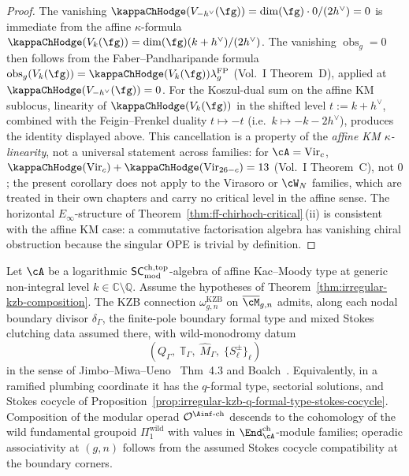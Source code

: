 \begin{proof}
The vanishing $\kappaChHodge(V_{-h^\vee}(\fg)) = \dim(\fg)\cdot 0/(2h^\vee)
= 0$ is immediate from the affine $\kappa$-formula
$\kappaChHodge(V_k(\fg)) = \dim(\fg)(k+h^\vee)/(2h^\vee)$. The vanishing
$\operatorname{obs}_g = 0$ then follows from the
Faber--Pandharipande formula
$\operatorname{obs}_g(V_k(\fg))
=\kappaChHodge(V_k(\fg))\lambda_g^{\mathrm{FP}}$
(Vol.~I Theorem~D), applied at
\(\kappaChHodge(V_{-h^\vee}(\fg))=0\). For the Koszul-dual
sum on the affine KM sublocus, linearity of
$\kappaChHodge(V_k(\fg))$ in the shifted level $t := k+h^\vee$, combined
with the Feigin--Frenkel duality $t \mapsto -t$
(i.e.\ $k \mapsto -k-2h^\vee$), produces the identity displayed
above. This cancellation is a property of the
\emph{affine KM $\kappa$-linearity}, not a universal statement
across families: for $\cA = \mathrm{Vir}_c$, $\kappaChHodge(\mathrm{Vir}_c)
+ \kappaChHodge(\mathrm{Vir}_{26-c}) = 13$ (Vol.~I Theorem~C), not $0$; the
present corollary does not apply to the Virasoro or $\cW_N$
families, which are treated in their own chapters and carry no
critical level in the affine sense. The horizontal
$E_\infty$-structure of
Theorem~\ref{thm:ff-chirhoch-critical}\,(ii) is consistent with the
affine KM case: a commutative factorisation algebra has vanishing
chiral obstruction because the singular OPE is trivial by definition.
\end{proof}

\begin{theorem}
\label{thm:irregular-kzb-composition-generic-level}

Let $\cA$ be a logarithmic $\mathsf{SC}^{\mathrm{ch,top}}_{\mathrm{mod}}$-algebra of affine Kac--Moody
type at generic non-integral level $k \in \mathbb{C} \setminus
\mathbb{Q}$. Assume the hypotheses of
Theorem~\ref{thm:irregular-kzb-composition}. The KZB connection
$\omega_{g,n}^{\mathrm{KZB}}$ on
$\overline{\cM}_{g,n}$ admits, along each nodal boundary divisor
$\delta_\Gamma$, the finite-pole boundary formal type and
mixed Stokes clutching data assumed there, with wild-monodromy datum
\[
 (Q_\Gamma,\; \mathbb{T}_\Gamma,\; \hat M_\Gamma,\;
 \{S_\ell^\pm\}_\ell)
\]
in the sense of Jimbo--Miwa--Ueno~\cite{JMU81} Thm~4.3 and
Boalch~\cite{Boalch2001,Boalch2014}. Equivalently, in a ramified
plumbing coordinate it has the \(q\)-formal type, sectorial solutions,
and Stokes cocycle of
Proposition~\ref{prop:irregular-kzb-q-formal-type-stokes-cocycle}.
Composition of the modular operad $\mathcal{O}^{\Ainf\text{-ch}}$
descends to the cohomology of the wild fundamental groupoid
$\Pi_1^{\mathrm{wild}}$ with values in
$\End^{\mathrm{ch}}_{\cA}$-module families; operadic associativity
at $(g,n)$ follows from the assumed Stokes cocycle compatibility at
the boundary corners.
\end{theorem}

